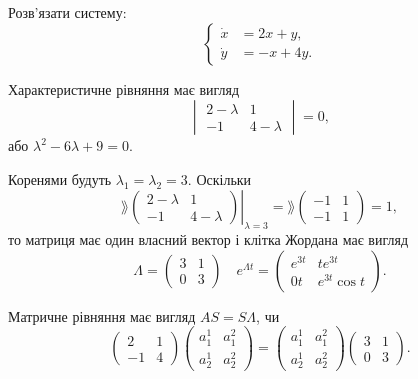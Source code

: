 \begin{example}
    Розв'язати систему:
    \[ \left\{ \begin{aligned}
        \dot x &= 2 x + y, \\
        \dot y &= -x + 4 y.
    \end{aligned} \right. \]
\end{example}

\begin{solution}
    Характеристичне рівняння має вигляд
    \[ \begin{vmatrix}
        2 - \lambda & 1 \\
        -1 & 4 - \lambda 
    \end{vmatrix} = 0, \]
    або $\lambda^2 - 6 \lambda + 9 = 0$. \parvskip
    
    Коренями будуть $\lambda_1 = \lambda_2 = 3$. Оскільки
    \[ \rang \left. \begin{pmatrix} 
        2 - \lambda & 1 \\
        -1 & 4 - \lambda 
    \end{pmatrix} \right|_{\lambda = 3} 
    = 
    \rang \begin{pmatrix} 
        -1 & 1 \\
        -1 & 1
    \end{pmatrix} = 1, \]
    то матриця має один власний вектор і клітка Жордана має вигляд
    \[ \Lambda = \begin{pmatrix} 3 & 1 \\ 0 & 3 \end{pmatrix} \quad e^{\Lambda t} = \begin{pmatrix} e^{3 t} & t e^{3 t} \\ 0 t & e^{3 t} \cos t \end{pmatrix}. \]
    
    Матричне рівняння має вигляд $A S = S \Lambda$, чи
    \[ \begin{pmatrix} 2 & 1 \\ -1 & 4 \end{pmatrix} \begin{pmatrix} a_1^1 & a_1^2 \\ a_2^1 & a_2^2 \end{pmatrix} = \begin{pmatrix} a_1^1 & a_1^2 \\ a_2^1 & a_2^2 \end{pmatrix} \begin{pmatrix} 3 & 1 \\ 0 & 3 \end{pmatrix}. \]
    

\end{solution}
